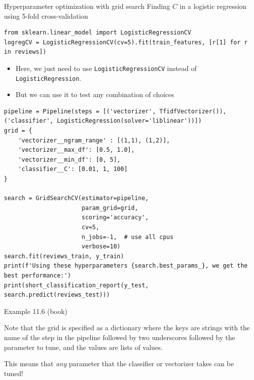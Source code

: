 \documentclass[compress]{beamer}
\begin{document}
\begin{frame}[fragile]{Hyperparameter optimization with grid search}
Finding $C$ in a logistic regression using 5-fold cross-validation
\begin{lstlisting}
from sklearn.linear_model import LogisticRegressionCV
logregCV = LogisticRegressionCV(cv=5).fit(train_features, [r[1] for r in reviews])
\end{lstlisting}
\pause 

\begin{itemize}[<+->]
	\item Here, we just need to use \texttt{LogisticRegressionCV} instead of \texttt{LogisticRegression}. 
	\item But we can use it to test any combination of choices
\end{itemize}
\end{frame}




\begin{frame}
	\small
\begin{lstlisting}
pipeline = Pipeline(steps = [('vectorizer', TfidfVectorizer()), ('classifier', LogisticRegression(solver='liblinear'))])
grid = {
    'vectorizer__ngram_range' : [(1,1), (1,2)],
    'vectorizer__max_df': [0.5, 1.0],
    'vectorizer__min_df': [0, 5],
    'classifier__C': [0.01, 1, 100]
}

search = GridSearchCV(estimator=pipeline,
                      param_grid=grid,
                      scoring='accuracy', 
                      cv=5,
                      n_jobs=-1,  # use all cpus
                      verbose=10)
search.fit(reviews_train, y_train)
print(f'Using these hyperparameters {search.best_params_}, we get the best performance:')
print(short_classification_report(y_test, search.predict(reviews_test)))
\end{lstlisting}
Example 11.6 (book)
\end{frame}

\begin{frame}[standout]
Note that the grid is specified as a dictionary where the keys are strings with the name of the step in the pipeline followed by two underscores followed by the parameter to tune, and the values are lists of values.

This means that \emph{any} parameter that the classifier or vectorizer takes can be tuned!
\end{frame}
\end{document}
